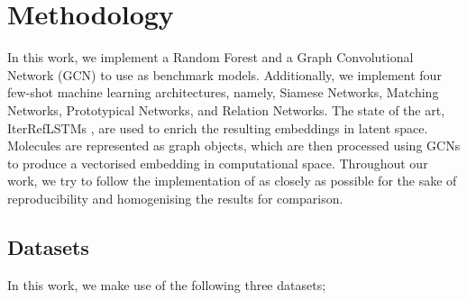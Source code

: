 \section{Methodology}

In this work, we implement a Random Forest and a Graph Convolutional Network (GCN) to use as benchmark models. Additionally, we implement four few-shot machine learning architectures, namely, Siamese Networks, Matching Networks, Prototypical Networks, and Relation Networks. The state of the art, IterRefLSTMs \citep{altae2017low}, are used to enrich the resulting embeddings in latent space. Molecules are represented as graph objects, which are then processed using GCNs to produce a vectorised embedding in computational space. Throughout our work, we try to follow the implementation of \citet{altae2017low} as closely as possible for the sake of reproducibility and homogenising the results for comparison.



\subsection{Datasets}

In this work, we make use of the following three datasets;

